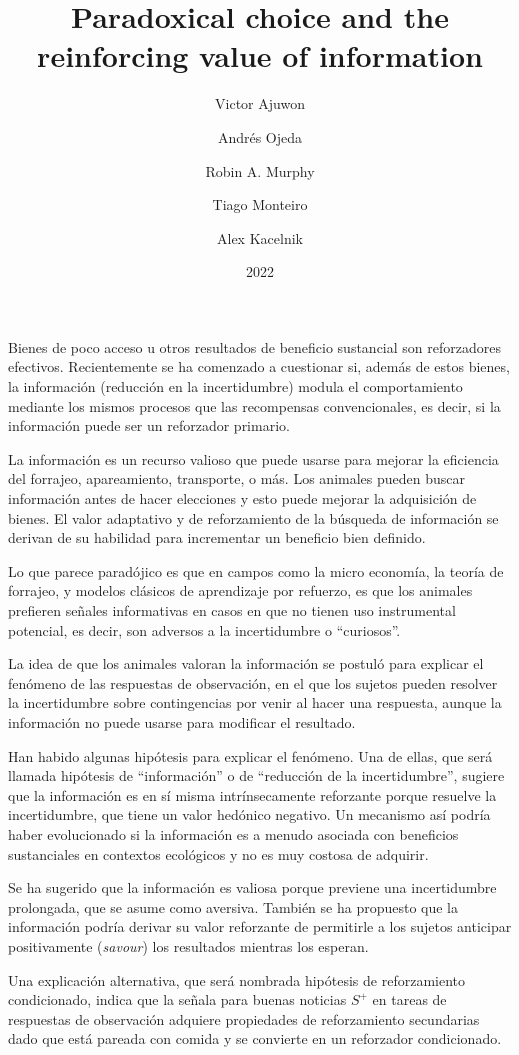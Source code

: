 \documentclass[a4paper,12pt]{article}
\title{Paradoxical choice and the reinforcing value of information}
\author{Victor Ajuwon \and Andrés Ojeda \and Robin A. Murphy \and Tiago Monteiro \and Alex Kacelnik}
\date{2022}
\begin{document}
{\scshape\bfseries \maketitle}

Bienes de poco acceso u otros resultados de beneficio sustancial son reforzadores efectivos. Recientemente se ha comenzado a cuestionar si, además de estos bienes, la información (reducción en la incertidumbre) modula el comportamiento mediante los mismos procesos que las recompensas convencionales, es decir, si la información puede ser un reforzador primario.

La información es un recurso valioso que puede usarse para mejorar la eficiencia del forrajeo, apareamiento, transporte, o más. Los animales pueden buscar información antes de hacer elecciones y esto puede mejorar la adquisición de bienes. El valor adaptativo y de reforzamiento de la búsqueda de información se derivan de su habilidad para incrementar un beneficio bien definido.

Lo que parece paradójico es que en campos como la micro economía, la teoría de forrajeo, y modelos clásicos de aprendizaje por refuerzo, es que los animales prefieren señales informativas en casos en que no tienen uso instrumental potencial, es decir, son adversos a la incertidumbre o ``curiosos''.

La idea de que los animales valoran la información se postuló para explicar el fenómeno de las respuestas de observación, en el que los sujetos pueden resolver la incertidumbre sobre contingencias por venir al hacer una respuesta, aunque la información no puede usarse para modificar el resultado.

Han habido algunas hipótesis para explicar el fenómeno. Una de ellas, que será llamada hipótesis de ``información'' o de ``reducción de la incertidumbre'', sugiere que la información es en sí misma intrínsecamente reforzante porque resuelve la incertidumbre, que tiene un valor hedónico negativo. Un mecanismo así podría haber evolucionado si la información es a menudo asociada con beneficios sustanciales en contextos ecológicos y no es muy costosa de adquirir.

Se ha sugerido que la información es valiosa porque previene una incertidumbre prolongada, que se asume como aversiva. También se ha propuesto que la información podría derivar su valor reforzante de permitirle a los sujetos anticipar positivamente ({\itshape savour}) los resultados mientras los esperan.

Una explicación alternativa, que será nombrada hipótesis de reforzamiento condicionado, indica que la señala para buenas noticias $S^{+}$ en tareas de respuestas de observación adquiere propiedades de reforzamiento secundarias dado que está pareada con comida y se convierte en un reforzador condicionado.
\end{document}
